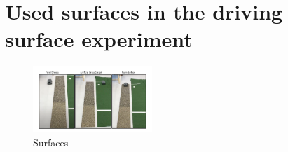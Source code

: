\section{Used surfaces in the driving surface experiment}

\begin{figure}[H]
    \centering
    \includegraphics[width=0.4\textwidth,height=0.45\textheight,keepaspectratio]{images/appendix.png}
    \caption{Surfaces}
    \label{fig:Carpet}
\end{figure}

